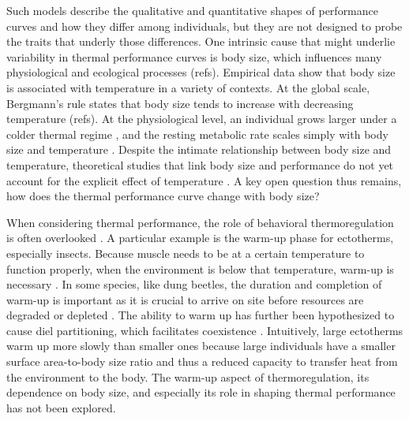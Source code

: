Such models describe the qualitative and quantitative shapes of performance curves and how they differ among individuals, but they are not designed to probe the traits that underly those differences.  %
One intrinsic cause that might underlie variability in thermal performance curves is body size, which influences many physiological and ecological processes \citep{Peters1986} (refs).
Empirical data show that body size is associated with temperature in a variety of contexts.
At the global scale, Bergmann's rule states that body size tends to increase with decreasing temperature \citep{Bergmann1847}(refs).
At the physiological level, an individual grows larger under a colder thermal regime \citep{VanVoorhies1996}, and the resting metabolic rate scales simply with body size and temperature \citep{Kleiber1947, Peters1986, Gillooly2001, Brown2004}.
Despite the intimate relationship between body size and temperature, theoretical studies that link body size and performance do not yet account for the explicit effect of temperature \citep[e.g.,][]{Yodzis1992, Brown1993}.
A key open question thus remains, how does the thermal performance curve change with body size?

When considering thermal performance, the role of behavioral thermoregulation is often overlooked \citep{Kearney2009b}.
A particular example is the warm-up phase for ectotherms, especially insects.
Because muscle needs to be at a certain temperature to function properly, when the environment is below that temperature, warm-up is necessary \citep[e.g.,][]{Heinrich1975}.
In some species, like dung beetles, the duration and completion of warm-up is important as it is crucial to arrive on site before resources are degraded or depleted \citep{Hanski1991}. %
The ability to warm up has further been hypothesized to cause diel partitioning, which facilitates coexistence \citep{Viljanen2009}.
Intuitively, large ectotherms warm up more slowly than smaller ones because large individuals have a smaller surface area-to-body size ratio and thus a reduced capacity to transfer heat from the environment to the body.
The warm-up aspect of thermoregulation, its dependence on body size, and especially its role in shaping thermal performance has not been explored.

